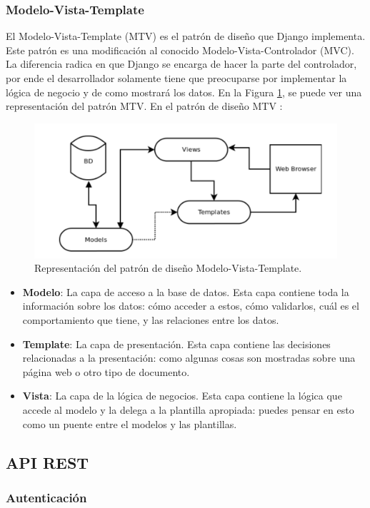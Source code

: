 \subsubsection{Modelo-Vista-Template}
El Modelo-Vista-Template (MTV) es el patrón de diseño que Django implementa. Este patrón es una modificación al conocido Modelo-Vista-Controlador (MVC). La diferencia radica en que Django se encarga de hacer la parte del controlador, por ende el desarrollador solamente tiene que preocuparse por implementar la lógica de negocio y de como mostrará los datos. En la Figura \ref{fig:mtv}, se puede ver una representación del patrón MTV. En el patrón de diseño MTV \cite{mtv}:

\begin{figure}
    \centering
    \includegraphics[width=\textwidth]{capitulo2/images/mtv.png}
    \caption{Representación del patrón de diseño Modelo-Vista-Template.}
    \label{fig:mtv}
\end{figure}

\begin{itemize}
    \item \textbf{Modelo}: La capa de acceso a la base de datos. Esta capa contiene toda la información sobre los datos: cómo acceder a estos, cómo validarlos, cuál es el comportamiento que tiene, y las relaciones entre los datos.
    \item \textbf{Template}: La capa de presentación. Esta capa contiene las decisiones relacionadas a la presentación: como algunas cosas son mostradas sobre una página web o otro tipo de documento.
    \item \textbf{Vista}: La capa de la lógica de negocios. Esta capa contiene la lógica que accede al modelo y la delega a la plantilla apropiada: puedes pensar en esto como un puente entre el modelos y las plantillas.
\end{itemize}


\subsection{API REST}
\subsubsection{Autenticación}

